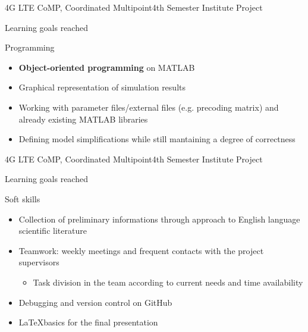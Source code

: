 \documentclass[xcolor={cmyk}]{beamer}
\begin{document}

\begin{frame}{4G LTE CoMP, Coordinated Multipoint}{4th Semester Institute Project}
	 \begin{block}{Learning goals reached}
	 	 \hspace*{.1\linewidth}\begin{minipage}{.8\linewidth}
    		\begin{block}{Programming}
      			\begin{itemize}
      				\item \textbf{Object-oriented programming} on MATLAB
      				\item Graphical representation of simulation results
      				\item Working with parameter files/external files (e.g. precoding matrix) and already existing MATLAB libraries
      				\item Defining model simplifications while still mantaining a degree of correctness
      			\end{itemize}
    		\end{block}
    	\end{minipage}
	 \end{block}	 
 \end{frame}

\begin{frame}{4G LTE CoMP, Coordinated Multipoint}{4th Semester Institute Project}
	 \begin{block}{Learning goals reached}
    	\hspace*{.1\linewidth}\begin{minipage}{.8\linewidth}
    		\begin{block}{Soft skills}
      			\begin{itemize}
      				\item Collection of preliminary informations through approach to English language scientific literature
      				\item Teamwork: weekly meetings and frequent contacts with the project supervisors
      				\begin{itemize}
      					\item Task division in the team according to current needs and time availability
      				\end{itemize}
      				\item Debugging and version control on GitHub
      				\item \LaTeX basics for the final presentation
      			\end{itemize}
    		\end{block}
    	\end{minipage}
	 \end{block}	 
 \end{frame}
\end{document}
